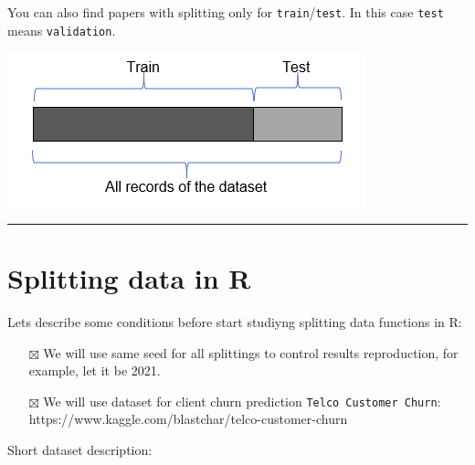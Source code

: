 \documentclass[
  letterpaper,
  DIV=11,
  numbers=noendperiod]{scrreprt}
\providecommand{\tightlist}{%
  \setlength{\itemsep}{0pt}\setlength{\parskip}{0pt}}\usepackage{longtable,booktabs,array}
\begin{document}
You can also find papers with splitting only for
\texttt{train}/\texttt{test}. In this case \texttt{test} means
\texttt{validation}.

\includegraphics{img/da-split/train_test2.png}

\begin{center}\rule{0.5\linewidth}{0.5pt}\end{center}

\section{Splitting data in R}\label{splitting-data-in-r}

Lets describe some conditions before start studiyng splitting data
functions in R:

\begin{itemize}
\tightlist
\item[$\boxtimes$]
  We will use same seed for all splittings to control results
  reproduction, for example, let it be 2021.
\item[$\boxtimes$]
  We will use dataset for client churn prediction
  \texttt{Telco\ Customer\ Churn}:
  https://www.kaggle.com/blastchar/telco-customer-churn
\end{itemize}

Short dataset description:
\end{document}
